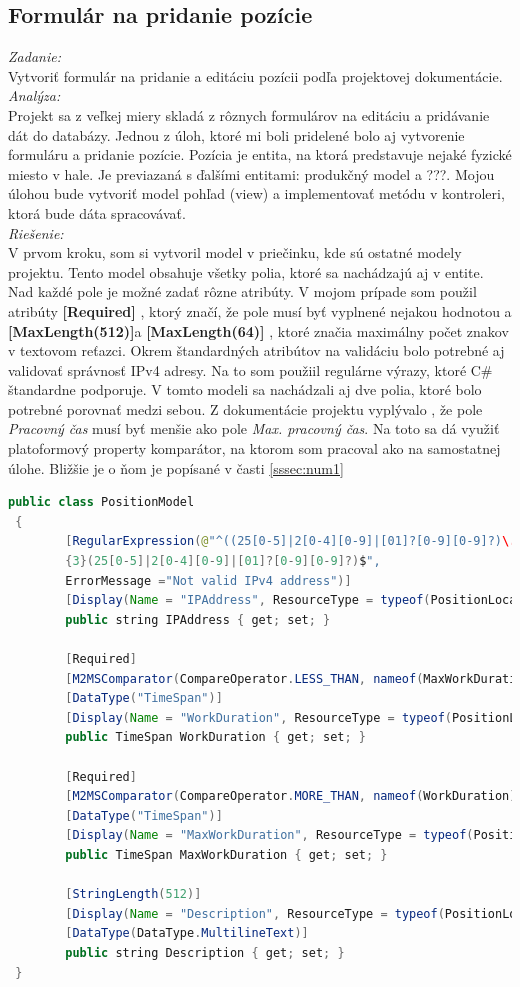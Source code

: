 \documentclass[11pt, oneside]{report}
\begin{document}
\subsection{Formulár na pridanie pozície}
\textit{Zadanie:}\\
Vytvoriť formulár na pridanie a editáciu pozícii podľa projektovej dokumentácie.
\\\textit{Analýza:}\\
Projekt sa z veľkej miery skladá z rôznych formulárov na editáciu a pridávanie  dát do databázy. Jednou z úloh, ktoré mi boli pridelené bolo aj vytvorenie formuláru a pridanie pozície. Pozícia je entita, na ktorá  predstavuje nejaké  fyzické miesto  v hale. Je previazaná s ďalšími entitami: produkčný model a ???. Mojou úlohou bude  vytvoriť model pohľad (view) a  implementovať  metódu v kontroleri, ktorá bude dáta  spracovávať. 
\\\textit{Riešenie:}\\
V prvom kroku, som si vytvoril model v priečinku, kde sú ostatné modely projektu. Tento model obsahuje  všetky polia, ktoré sa nachádzajú aj v entite. Nad každé pole je možné zadať rôzne atribúty. V mojom prípade som použil atribúty \textbf{[Required]} , ktorý značí, že pole  musí byť vyplnené nejakou hodnotou a \textbf{[MaxLength(512)]}a \textbf{[MaxLength(64)]} , ktoré značia maximálny počet znakov v textovom reťazci. Okrem štandardných atribútov na validáciu bolo potrebné aj validovať  správnosť IPv4 adresy. Na to som použiil regulárne výrazy, ktoré C\# štandardne podporuje. V tomto modeli sa nachádzali aj dve polia, ktoré bolo potrebné porovnať medzi sebou. Z dokumentácie projektu vyplývalo , že pole \textit{Pracovný čas} musí byť menšie ako pole \textit{Max. pracovný čas}. Na toto sa  dá využiť platoformový property komparátor, na ktorom som pracoval ako na samostatnej úlohe. Bližšie je o ňom  je popísané v časti \ref{sssec:num1}
\begin{lstlisting}[language=Java,showstringspaces=false, caption= Časť modelu pozície s validačnými atribútmi,captionpos=b]
 public class PositionModel
 {        
        [RegularExpression(@"^((25[0-5]|2[0-4][0-9]|[01]?[0-9][0-9]?)\.)
        {3}(25[0-5]|2[0-4][0-9]|[01]?[0-9][0-9]?)$", 
        ErrorMessage ="Not valid IPv4 address")]
        [Display(Name = "IPAddress", ResourceType = typeof(PositionLocale))]
        public string IPAddress { get; set; }

        [Required]
        [M2MSComparator(CompareOperator.LESS_THAN, nameof(MaxWorkDuration))]
        [DataType("TimeSpan")]
        [Display(Name = "WorkDuration", ResourceType = typeof(PositionLocale))]
        public TimeSpan WorkDuration { get; set; }

        [Required]
        [M2MSComparator(CompareOperator.MORE_THAN, nameof(WorkDuration))]
        [DataType("TimeSpan")]
        [Display(Name = "MaxWorkDuration", ResourceType = typeof(PositionLocale))]
        public TimeSpan MaxWorkDuration { get; set; }
        
        [StringLength(512)]
        [Display(Name = "Description", ResourceType = typeof(PositionLocale))]
        [DataType(DataType.MultilineText)]
        public string Description { get; set; }        
 }
\end{lstlisting}
\end{document}
